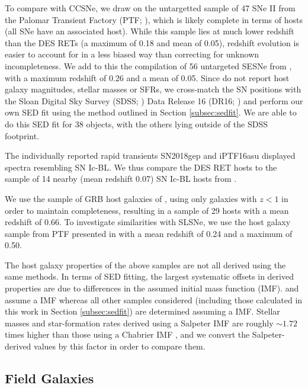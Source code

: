\documentclass[fleqn,usenatbib,]{mnras}
\newcommand{\replyref}[1]{\color{magenta}#1 \color{black}}
\begin{document}
To compare with CCSNe, we draw on the untargetted sample of 47 SNe II from the Palomar Transient Factory (PTF; \citealt{Stoll2013}), which is likely complete in terms of hosts (all SNe have an associated host). While this sample lies at much lower redshift than the DES RETs (a maximum of 0.18 and mean of 0.05), redshift evolution is easier to account for in a less biased way than correcting for unknown incompleteness. We add to this the compilation of 56 untargeted SESNe from \citet{Sanders2012}, with a maximum redshift of 0.26 and a mean of 0.05. Since \citet{Sanders2012} do not report host galaxy magnitudes, stellar masses or SFRs, we cross-match the SN positions with the Sloan Digital Sky Survey (SDSS; \citealt{York2000}) Data Release 16 (DR16; \citealt{Ahumada2019}) and perform our own SED fit using the method outlined in Section \ref{subsec:sedfit}. We are able to do this SED fit for 38 objects, with the others lying outside of the SDSS footprint.

\replyref{The individually reported rapid transients SN2018gep and iPTF16asu displayed spectra resembling SN Ic-BL. We thus compare the DES RET hosts to the sample of 14 nearby (mean redshift 0.07) SN Ic-BL hosts from \citet{Modjaz2019}.}

We use the sample of GRB host galaxies of \citet{Kruehler2015}, using only galaxies with $z<1$ in order to maintain completeness, resulting in a sample of 29 hosts with a mean redshift of 0.66. To investigate similarities with SLSNe, we use the host galaxy sample from PTF presented in \citet{Perley2016c} with a mean redshift of 0.24 and a maximum of 0.50.

The host galaxy properties of the above samples are not all derived using the same methods. In terms of SED fitting, the largest systematic offsets in derived properties are due to differences in the assumed initial mass function (IMF). \citet{Stoll2013} and \citet{Drout2014} assume a \citet{Salpeter1955} IMF whereas all other samples considered (including those calculated in this work in Section \ref{subsec:sedfit}) are determined assuming a \citet{Chabrier2003} IMF. Stellar masses and star-formation rates derived using a Salpeter IMF are roughly $\sim 1.72$ times higher than those using a Chabrier IMF \citep{Speagle2014}, and we convert the Salpeter-derived values by this factor in order to compare them.

\subsection{Field Galaxies \label{subsubsec:sdss}}
\end{document}
